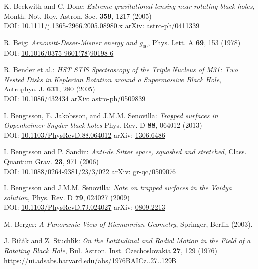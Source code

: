 \begin{thebibliography}{123}
K. Beckwith and C. Done:
{\em Extreme gravitational lensing near rotating black holes},
Month. Not. Roy. Astron. Soc. {\bf 359}, 1217 (2005)\\
DOI: \href{https://doi.org/10.1111/j.1365-2966.2005.08980.x}{10.1111/j.1365-2966.2005.08980.x}\hfill
arXiv: \href{https://arxiv.org/abs/astro-ph/0411339}{astro-ph/0411339}

R. Beig:
{\em Arnowitt-Deser-Misner energy and $g_{00}$},
Phys. Lett. A {\bf 69}, 153 (1978)\\
DOI: \href{https://doi.org/10.1016/0375-9601(78)90198-6}{10.1016/0375-9601(78)90198-6}

R. Bender et al.:
{\em HST STIS Spectroscopy of the Triple Nucleus of M31: Two Nested Disks in Keplerian Rotation around a Supermassive Black Hole},
Astrophys. J. {\bf 631}, 280 (2005)\\
DOI: \href{https://doi.org/10.1086/432434}{10.1086/432434}\hfill
arXiv: \href{https://arxiv.org/abs/astro-ph/0509839}{astro-ph/0509839}

I. Bengtsson, E. Jakobsson, and J.M.M. Senovilla:
{\em Trapped surfaces in Oppenheimer-Snyder black holes}
Phys. Rev. D {\bf 88}, 064012 (2013)\\
DOI: \href{https://doi.org/10.1103/PhysRevD.88.064012}{10.1103/PhysRevD.88.064012}\hfill
arXiv: \href{https://arxiv.org/abs/1306.6486}{1306.6486}

I. Bengtsson and P. Sandin:
{\em Anti-de Sitter space, squashed and stretched},
Class. Quantum Grav. {\bf 23}, 971 (2006)\\
DOI: \href{https://doi.org/10.1088/0264-9381/23/3/022}{10.1088/0264-9381/23/3/022}\hfill
arXiv: \href{https://arxiv.org/abs/gr-qc/0509076}{gr-qc/0509076}

I. Bengtsson and J.M.M. Senovilla:
{\em Note on trapped surfaces in the Vaidya solution},
Phys. Rev. D {\bf 79}, 024027 (2009)\\
DOI: \href{https://doi.org/10.1103/PhysRevD.79.024027}{10.1103/PhysRevD.79.024027}\hfill
arXiv: \href{https://arxiv.org/abs/0809.2213}{0809.2213}

M. Berger: {\em A Panoramic View of Riemannian Geometry},
Springer, Berlin (2003).

J. Bi\v{c}\'{a}k and Z. Stuchl\'{\i}k:
{\em On the Latitudinal and Radial Motion in the Field of a Rotating Black Hole},
Bul. Astron. Inst. Czechoslovakia {\bf 27}, 129 (1976)\\
\url{https://ui.adsabs.harvard.edu/abs/1976BAICz..27..129B}


\end{thebibliography}
